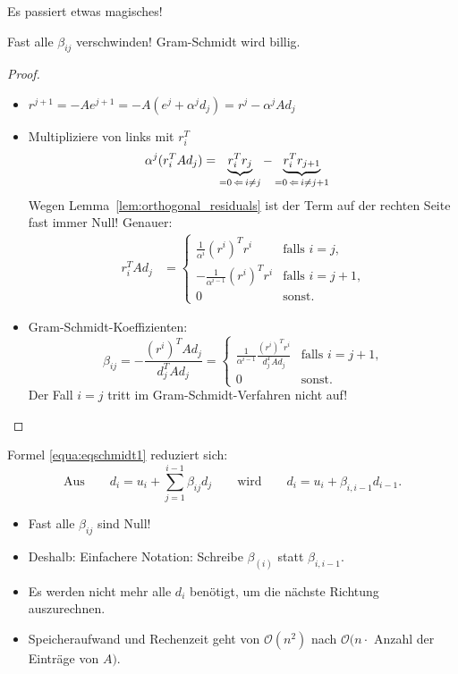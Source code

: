 Es passiert etwas magisches!
\begin{lemma}
Fast alle $\beta_{ij}$ verschwinden! Gram-Schmidt wird billig.
\end{lemma}
\begin{proof}
\begin{itemize}
 \item $r^{j+1}=-Ae^{j+1}=-A (e^j+\alpha^jd_j)=r^j-\alpha^jAd_j$

 \item Multipliziere von links mit $r_i^T$
  \begin{align*}
   \alpha^j (r_i^TAd_j) & =\underbrace{r_i^Tr_j}_{=0 \thinspace \Leftarrow \thinspace i \neq j}
      -\underbrace{r_i^Tr_{j+1}}_{=0 \thinspace \Leftarrow \thinspace i \neq j+1}
  \end{align*}
 Wegen Lemma~\ref{lem:orthogonal_residuals} ist der Term auf der rechten Seite
 fast immer Null!  Genauer:
  \begin{align*}
   r_i^TAd_j
    & =
    \begin{cases}
      \frac{1}{\alpha^i} (r^i)^Tr^i &  \text{falls $i=j$,} \\
     -\frac{1}{\alpha^{i-1}} (r^i)^T r^i & \text{falls $i=j+1$,} \\
     0 & \text{sonst.}
    \end{cases}
  \end{align*}

 \item Gram-Schmidt-Koeffizienten:
  \begin{equation*}
   \beta_{ij}
    =
   -\frac{(r^i)^TAd_j}{d_j^TAd_j}
    =
   \begin{cases}
   \frac{1}{\alpha^{i-1}} \frac{\left(r^i \right)^T r^i}{d_j^TAd_j} & \text{falls $i=j+1$,} \\
     0 &  \text{sonst}.
   \end{cases}
  \end{equation*}
  Der Fall $i=j$ tritt im Gram-Schmidt-Verfahren nicht auf! \qedhere
\end{itemize}
\end{proof}
Formel \eqref{equa:eqschmidt1} reduziert sich:
\begin{equation}
\label{eq:simplified_gram_schmidt_coefficient}
 \text{Aus}
 \qquad d_i=u_i+\sum_{j=1}^{i-1} \beta_{ij}d_j
 \qquad \text{wird}
 \qquad d_i=u_i+\beta_{i,i-1}d_{i-1}.
\end{equation}
\begin{itemize}
 \item Fast alle $\beta_{ij}$ sind Null!
 \item Deshalb: Einfachere Notation: Schreibe $\beta_{(i)}$ statt $\beta_{i,i-1}$.
 \item Es werden nicht mehr alle $d_i$ benötigt, um die nächste Richtung auszurechnen.
 \item Speicheraufwand und Rechenzeit geht von $\mathcal{O} \left(n^2 \right)$ nach $\mathcal{O}(n \cdot$ Anzahl der Einträge von $A)$.
\end{itemize}


